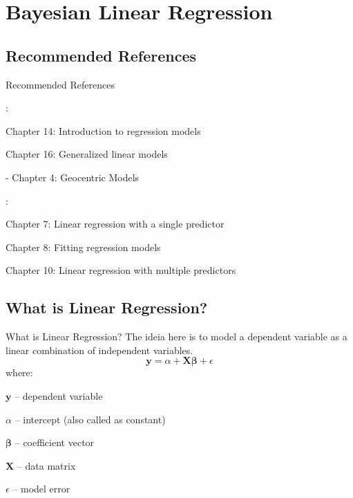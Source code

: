 \section{Bayesian Linear Regression}

\subsection{Recommended References}
\begin{frame}{Recommended References}
	\begin{vfilleditems}
		\item \textcite{gelman2013bayesian}:
		\begin{vfilleditems}
			\item Chapter 14: Introduction to regression models
			\item Chapter 16: Generalized linear models
		\end{vfilleditems}
		\item \textcite{mcelreath2020statistical} - Chapter 4: Geocentric Models
		\item \textcite{gelman2020regression}:
		\begin{vfilleditems}
			\item Chapter 7: Linear regression with a single predictor
			\item Chapter 8: Fitting regression models
			\item Chapter 10: Linear regression with multiple predictors
		\end{vfilleditems}
	\end{vfilleditems}
\end{frame}

\subsection{What is Linear Regression?}
\begin{frame}{What is Linear Regression?}
	The ideia here is to model a dependent variable as a linear combination
	of independent variables.
	$$
		\mathbf{y} = \alpha +  \mathbf{X} \boldsymbol{\beta} + \epsilon
	$$
	where:
	\begin{vfilleditems}
		\item $\mathbf{y}$ -- dependent variable
		\item $\alpha$ -- intercept (also called as constant)
		\item $\boldsymbol{\beta}$ -- coefficient vector
		\item $\mathbf{X}$ -- data matrix
		\item $\epsilon$ -- model error
	\end{vfilleditems}
\end{frame}


